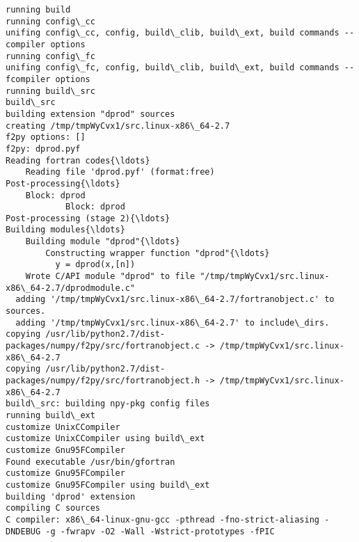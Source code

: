     \begin{Verbatim}[commandchars=\\\{\}]
running build
running config\_cc
unifing config\_cc, config, build\_clib, build\_ext, build commands --compiler options
running config\_fc
unifing config\_fc, config, build\_clib, build\_ext, build commands --fcompiler options
running build\_src
build\_src
building extension "dprod" sources
creating /tmp/tmpWyCvx1/src.linux-x86\_64-2.7
f2py options: []
f2py: dprod.pyf
Reading fortran codes{\ldots}
	Reading file 'dprod.pyf' (format:free)
Post-processing{\ldots}
	Block: dprod
			Block: dprod
Post-processing (stage 2){\ldots}
Building modules{\ldots}
	Building module "dprod"{\ldots}
		Constructing wrapper function "dprod"{\ldots}
		  y = dprod(x,[n])
	Wrote C/API module "dprod" to file "/tmp/tmpWyCvx1/src.linux-x86\_64-2.7/dprodmodule.c"
  adding '/tmp/tmpWyCvx1/src.linux-x86\_64-2.7/fortranobject.c' to sources.
  adding '/tmp/tmpWyCvx1/src.linux-x86\_64-2.7' to include\_dirs.
copying /usr/lib/python2.7/dist-packages/numpy/f2py/src/fortranobject.c -> /tmp/tmpWyCvx1/src.linux-x86\_64-2.7
copying /usr/lib/python2.7/dist-packages/numpy/f2py/src/fortranobject.h -> /tmp/tmpWyCvx1/src.linux-x86\_64-2.7
build\_src: building npy-pkg config files
running build\_ext
customize UnixCCompiler
customize UnixCCompiler using build\_ext
customize Gnu95FCompiler
Found executable /usr/bin/gfortran
customize Gnu95FCompiler
customize Gnu95FCompiler using build\_ext
building 'dprod' extension
compiling C sources
C compiler: x86\_64-linux-gnu-gcc -pthread -fno-strict-aliasing -DNDEBUG -g -fwrapv -O2 -Wall -Wstrict-prototypes -fPIC


\end{Verbatim}
